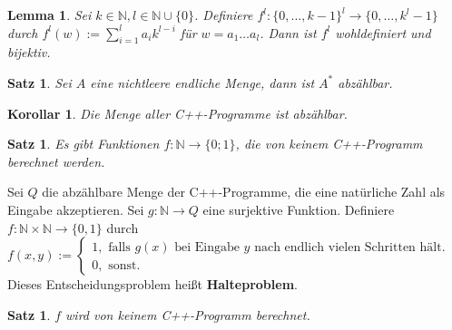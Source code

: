 \documentclass[12pt,a4paper]{article}
\theoremstyle{plain}
\newtheorem{Satz}[Theorem]{Satz}
\newtheorem{Lemma}[Theorem]{Lemma}
\newtheorem{Korollar}[Theorem]{Korollar}
\newcommand{\N}{\mathbb{N}}
\numberwithin{equation}{section}
\begin{document}
\begin{Lemma}
Sei $k\in \N, l\in \N\cup\{0\}$. Definiere $f^l: \{0,\ldots,k-1\}^l\rightarrow \{0,\ldots,k^ l-1\}$ durch $f^l(w):=\sum_{i=1}^l a_i k^{l-i}$ für $w=a_1\ldots a_l$. Dann ist $f^l$ wohldefiniert und bijektiv.
\end{Lemma}
\begin{Satz}
Sei $A$ eine nichtleere endliche Menge, dann ist $A^*$ abzählbar.
\end{Satz}
\begin{Korollar}
Die Menge aller C++-Programme ist abzählbar.
\end{Korollar}
\begin{Satz}
Es gibt Funktionen $f: \N\rightarrow \{0;1\}$, die von keinem C++-Programm berechnet werden.
\end{Satz}
Sei $Q$ die abzählbare Menge der C++-Programme, die eine natürliche Zahl als Eingabe akzeptieren. Sei $g: \N \rightarrow Q$ eine surjektive Funktion. Definiere $f:\N\times\N \rightarrow \{0,1\}$ durch \\
$f(x,y):=\left\lbrace\begin{array}{l}
1, \text{ falls }g(x) \text{ bei Eingabe }y\text{ nach endlich vielen Schritten hält.}\\ 
0, \text{ sonst.}
\end{array} \right.$\\
Dieses Entscheidungsproblem heißt \textbf{Halteproblem}.
\begin{Satz}
$f$ wird von keinem C++-Programm berechnet.
\end{Satz}
\end{document}
